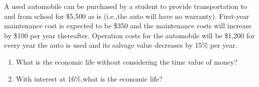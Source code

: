 \begin{exercises}
    \begin{exercise}
    \label{sea-09-10}
        A used automobile can be purchased by a student to provide transportation to and from school for \$5,500 as is (i.e.,the auto will have no warranty). First-year maintenance cost is expected to be \$350 and the maintenance costs will increase by \$100 per year thereafter. Operation costs for the automobile will be \$1,200 for every year the auto is used and its salvage value decreases by 15\% per year.
        \begin{enumerate}[label=\alph*)]
            \item What is the economic life without considering the time value of money?
            \item With interest at 16\%,what is the economic life?
        \end{enumerate}
    \end{exercise}
    \begin{solution}
    \end{solution}
\end{exercises}
